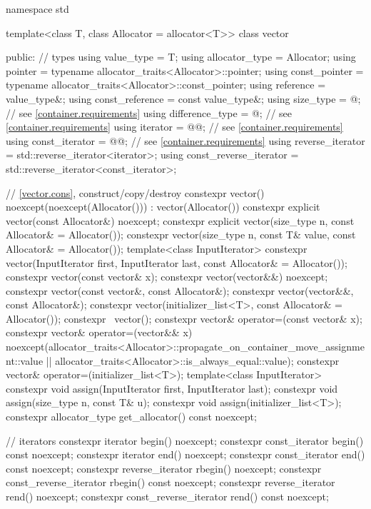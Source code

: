 \begin{codeblock}
namespace std {
  template<class T, class Allocator = allocator<T>>
  class vector {
  public:
    // types
    using value_type             = T;
    using allocator_type         = Allocator;
    using pointer                = typename allocator_traits<Allocator>::pointer;
    using const_pointer          = typename allocator_traits<Allocator>::const_pointer;
    using reference              = value_type&;
    using const_reference        = const value_type&;
    using size_type              = @\impdef@; // see \ref{container.requirements}
    using difference_type        = @\impdef@; // see \ref{container.requirements}
    using iterator               = @@; // see \ref{container.requirements}
    using const_iterator         = @@; // see \ref{container.requirements}
    using reverse_iterator       = std::reverse_iterator<iterator>;
    using const_reverse_iterator = std::reverse_iterator<const_iterator>;

    // \ref{vector.cons}, construct/copy/destroy
    constexpr vector() noexcept(noexcept(Allocator())) : vector(Allocator()) { }
    constexpr explicit vector(const Allocator&) noexcept;
    constexpr explicit vector(size_type n, const Allocator& = Allocator());
    constexpr vector(size_type n, const T& value, const Allocator& = Allocator());
    template<class InputIterator>
      constexpr vector(InputIterator first, InputIterator last, const Allocator& = Allocator());
    constexpr vector(const vector& x);
    constexpr vector(vector&&) noexcept;
    constexpr vector(const vector&, const Allocator&);
    constexpr vector(vector&&, const Allocator&);
    constexpr vector(initializer_list<T>, const Allocator& = Allocator());
    constexpr ~vector();
    constexpr vector& operator=(const vector& x);
    constexpr vector& operator=(vector&& x)
      noexcept(allocator_traits<Allocator>::propagate_on_container_move_assignment::value ||
               allocator_traits<Allocator>::is_always_equal::value);
    constexpr vector& operator=(initializer_list<T>);
    template<class InputIterator>
      constexpr void assign(InputIterator first, InputIterator last);
    constexpr void assign(size_type n, const T& u);
    constexpr void assign(initializer_list<T>);
    constexpr allocator_type get_allocator() const noexcept;

    // iterators
    constexpr iterator               begin() noexcept;
    constexpr const_iterator         begin() const noexcept;
    constexpr iterator               end() noexcept;
    constexpr const_iterator         end() const noexcept;
    constexpr reverse_iterator       rbegin() noexcept;
    constexpr const_reverse_iterator rbegin() const noexcept;
    constexpr reverse_iterator       rend() noexcept;
    constexpr const_reverse_iterator rend() const noexcept;

}}
\end{codeblock}
